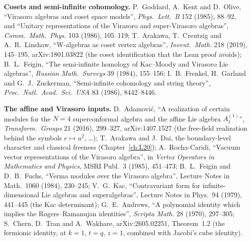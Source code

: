 \textbf{Cosets and semi-infinite cohomology.} P.~Goddard, A.~Kent and D.~Olive, ``Virasoro algebras and coset space models'', \emph{Phys.\ Lett.\ B} 152
(1985), 88--92, and ``Unitary representations of the Virasoro and super-Virasoro algebras'', \emph{Comm.\ Math.\ Phys.} 103 (1986), 105--119;
T.~Arakawa, T.~Creutzig and A.~R.~Linshaw, ``W-algebras as coset vertex algebras'', \emph{Invent.\ Math.} 218 (2019), 145--195, arXiv:1801.03822 (the coset
identification that the Lean proof avoids); B.~L.~Feigin, ``The semi-infinite homology of Kac--Moody and Virasoro Lie algebras'', \emph{Russian Math.\ Surveys}
39 (1984), 155--156; I.~B.~Frenkel, H.~Garland and G.~J.~Zuckerman, ``Semi-infinite cohomology and string theory'', \emph{Proc.\ Natl.\ Acad.\ Sci.\ USA} 83
(1986), 8442--8446.

\textbf{The affine and Virasoro inputs.} D.~Adamović, ``A realization of certain modules for the $N=4$ superconformal algebra and the affine Lie algebra
$A_1^{(1)}$'', \emph{Transform.\ Groups} 21 (2016), 299--327, arXiv:1407.1527 (the free-field realization behind the symbols $e\mapsto u^2$, \ldots); T.~Arakawa and
J.~Dai, the boundary-level character and classical freeness (Chapter~\ref{ch:L20}); A.~Rocha-Caridi, ``Vacuum vector representations of the Virasoro algebra'', in
\emph{Vertex Operators in Mathematics and Physics}, MSRI Publ.\ 3 (1985), 451--473; B.~L.~Feigin and D.~B.~Fuchs, ``Verma modules over the Virasoro algebra'',
Lecture Notes in Math.\ 1060 (1984), 230--245; V.~G.~Kac, ``Contravariant form for infinite-dimensional Lie algebras and superalgebras'', Lecture Notes in Phys.\ 94
(1979), 441--445 (the Kac determinant); G.~E.~Andrews, ``A polynomial identity which implies the Rogers--Ramanujan identities'', \emph{Scripta Math.} 28 (1970),
297--305; S.~Chern, D.~Tran and A.~Wakhare, arXiv:2605.02251, Theorem~1.2 (the fermionic identity, at $k=1$, $t=q$, $z=1$, combined with Jacobi's cube identity).

\endgroup
